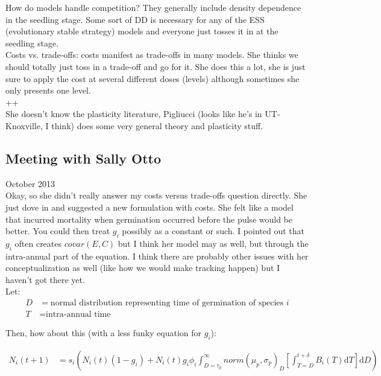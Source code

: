 \documentclass[11pt,a4paper,oneside]{article}
\begin{document}
\begin{itemize}
\noindent How do models handle competition? They generally include density dependence in the seedling stage. Some sort of DD is necessary for any of the ESS (evolutionary stable strategy) models and everyone just tosses it in at the seedling stage.\\

\noindent Costs vs. trade-offs: costs manifest as trade-offs in many models. She thinks we should totally just toss in a trade-off and go for it. She does this a lot, she is just sure to apply the cost at several different doses (levels) although sometimes she only presents one level.\\

++\\

\noindent She doesn't know the plasticity literature, Pigliucci (looks like he's in UT-Knoxville, I think) does some very general theory and plasticity stuff. \\

\newpage
\subsection{Meeting with Sally Otto} 

 October 2013\\

\noindent Okay, so she didn't really answer my costs versus trade-offs question directly. She just dove in and suggested a new formulation with costs. She felt like a model that incurred mortality when germination occurred before the pulse would be better. You could then treat \(g_{i}\) possibly as a constant or such. I pointed out that \(g_{i}\) often creates \(covar(E,C)\) but I think her model may as well, but through the intra-annual part of the equation. I think there are probably other issues with her conceptualization as well (like how we would make tracking happen) but I haven't got there yet.\\

\noindent Let:
\begin{align*}
D & = \text{normal distribution representing time of germination of species }i\\
T & = \text{intra-annual time}
\end{align*}

\noindent Then, how about this (with a less funky equation for \(g_{i}\)):

\begin{align*}
N_{i}(t+1) & =
s_{i}(N_{i}(t)(1-g_{i})+N_{i}(t)g_{i}\phi_{i}\int_{D=\tau_{p}}^{\infty}norm(\mu_{p}, \sigma_{p})_{D} [\int_{T=D}^{t+\delta}B_{i}(T) \mathrm{d}T] \mathrm{d}D)
\end{align*}


\end{itemize}
\end{document}
